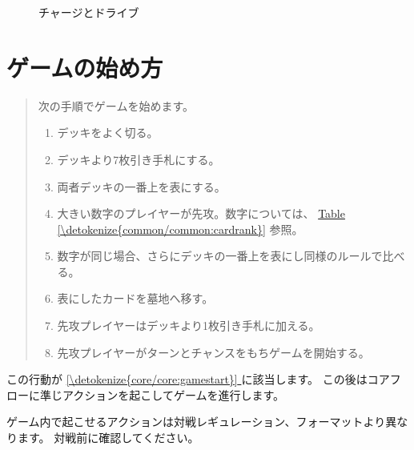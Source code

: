 \documentclass[letterpaper,10pt,dvipdfmx]{sphinxmanual}
\begin{document}
\begin{figure}[htbp]
\centering
\capstart

\noindent{}
\caption{チャージとドライブ}\label{\detokenize{common/common:id52}}\label{\detokenize{common/common:chargedrive}}\end{figure}


\section{ゲームの始め方}
\label{\detokenize{common/common:id15}}\begin{quote}

\sphinxAtStartPar
次の手順でゲームを始めます。
\begin{enumerate}
%
\item {} 
\sphinxAtStartPar
デッキをよく切る。

\item {} 
\sphinxAtStartPar
デッキより7枚引き手札にする。

\item {} 
\sphinxAtStartPar
両者デッキの一番上を表にする。

\item {} 
\sphinxAtStartPar
大きい数字のプレイヤーが先攻。数字については、 \hyperref[\detokenize{common/common:cardrank}]{Table \ref{\detokenize{common/common:cardrank}}} 参照。

\item {} 
\sphinxAtStartPar
数字が同じ場合、さらにデッキの一番上を表にし同様のルールで比べる。

\item {} 
\sphinxAtStartPar
表にしたカードを墓地へ移す。

\item {} 
\sphinxAtStartPar
先攻プレイヤーはデッキより1枚引き手札に加える。

\item {} 
\sphinxAtStartPar
先攻プレイヤーがターンとチャンスをもちゲームを開始する。

\end{enumerate}
\end{quote}

\sphinxAtStartPar
この行動が \hyperref[\detokenize{core/core:gamestart}]{\ref{\detokenize{core/core:gamestart}} } に該当します。
この後はコアフローに準じアクションを起こしてゲームを進行します。

\sphinxAtStartPar
ゲーム内で起こせるアクションは対戦レギュレーション、フォーマットより異なります。
対戦前に確認してください。
\end{document}
